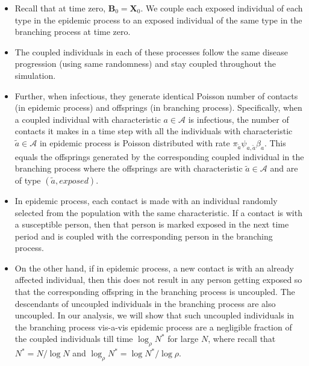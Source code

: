 \documentclass{article}
\theoremstyle{definition}
\begin{document}
\begin{itemize}
\item
Recall that at time zero, $\bm{B}_0=\bm{X}_0$. We couple each exposed individual of each type in the epidemic process to an exposed individual of the same type in the branching process at time zero. 
\item
The coupled individuals in each of these processes follow the same disease progression (using same randomness)  and stay coupled throughout the simulation.
\item
Further,  when infectious, they generate  identical Poisson number of contacts (in epidemic process) and offsprings (in branching process).
Specifically,  when a coupled individual with characteristic $a\in \mathcal A$ is infectious, the number of contacts it makes in a time step 
 with all the individuals with characteristic $\tilde{a} \in \mathcal A$ in epidemic process is Poisson distributed with rate 
 $\pi_{\tilde{a}} \psi_{a,\tilde{a}} \beta_{a}$. This equals the offsprings generated by the
 corresponding coupled individual in the branching process where the  offsprings are  with 
 characteristic $\tilde{a} \in \mathcal A$ and are of  type $(\tilde{a},exposed)$.
 \item
 In epidemic process, each contact is made with an individual randomly selected from the population with the same characteristic. 
If a contact is with a susceptible person, then that person is marked exposed in the next time period
and is coupled with the corresponding person in the branching process.
\item
 On the other hand, if in epidemic  process, a new contact is with an already  affected individual, then this does not result in any person getting exposed
so that the corresponding offspring in the branching process is uncoupled.  
The descendants of uncoupled individuals in the branching process are also uncoupled. 
In our analysis, we will show that such uncoupled individuals in the branching process vis-a-vis epidemic process are a negligible fraction of the coupled individuals 
till time  $\log_\rho N^*$ for large $N$, where recall that $N^*= N/\log N$ and $\log_\rho N^* = \log N^* /\log \rho$. 
\end{itemize}
\end{document}
